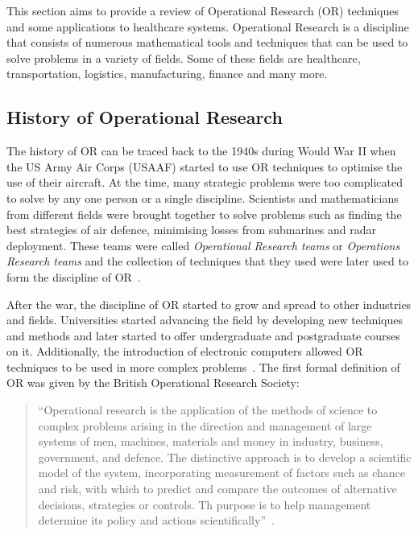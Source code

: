 This section aims to provide a review of Operational Research (OR) techniques
and some applications to healthcare systems.
Operational Research is a discipline that consists of numerous mathematical
tools and techniques that can be used to solve problems in a variety of
fields.
Some of these fields are healthcare, transportation, logistics, manufacturing,
finance and many more.

\subsection{History of Operational Research}

The history of OR can be traced back to the 1940s during Would War II when the
US Army Air Corps (USAAF) started to use OR techniques to optimise the use of
their aircraft.
At the time, many strategic problems were too complicated to solve by any one
person or a single discipline.
Scientists and mathematicians from different fields were brought together to
solve problems such as finding the best strategies of air defence, minimising
losses from submarines and radar deployment.
These teams were called \textit{Operational Research teams} or
\textit{Operations Research teams} and the collection of techniques that they
used were later used to form the discipline of
OR~\cite{ravindran2008operations}.

After the war, the discipline of OR started to grow and spread to other
industries and fields.
Universities started advancing the field by developing new techniques and
methods and later started to offer undergraduate and postgraduate courses on it.
Additionally, the introduction of electronic computers allowed OR techniques to
be used in more complex problems~\cite{ravindran2008operations}.
The first formal definition of OR was given by the British Operational
Research Society:

\begin{quotation}
    ``Operational research is the application of the methods of science to
    complex problems arising in the direction and management of large systems of
    men, machines, materials and money in industry, business, government, and
    defence.
    The distinctive approach is to develop a scientific model of the system,
    incorporating measurement of factors such as chance and risk, with which to
    predict and compare the outcomes of alternative decisions, strategies or
    controls.
    Th purpose is to help management determine its policy and actions
    scientifically''~\cite{or_for_multi_organizations}.
\end{quotation}


